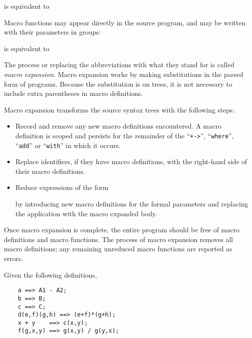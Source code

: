 
is equivalent to


Macro functions may appear directly in the source program,
and may be written with their parameters in groups:


is equivalent to


The process or replacing the abbreviations with what they stand for
is called {\em macro expansion}.
Macro expansion works by making substitutions
in the parsed form of programs.
Because the substitution is on trees, it is not
necessary to include extra parentheses in macro definitions.

Macro expansion transforms the source syntax trees with the following steps:
\begin{itemize}
\item
   Record and remove any new macro definitions encountered.
   A macro definition is scoped and persists for the remainder of the
  ``\verb"+->"'', ``\verb"where"'', ``\verb"add"'' or ``\verb"with"''
  in which it occurs.
\item
   Replace identifiers, if they have macro definitions,
   with the right-hand side of their macro definitions.
\item
   Reduce expressions of the form


by introducing new macro definitions for the formal parameters
and replacing the application with the macro expanded body.
\end{itemize}
Once macro expansion is complete, the entire program should be
free of macro definitions and macro functions.
The process of macro expansion removes all macro definitions;
any remaining unreduced macro functions are reported as errors.



Given the following definitions,

\begin{small}
\begin{verbatim}
    a ==> A1 - A2;
    b ==> B;
    c ==> C;
    d(e,f)(g,h) ==> (e+f)*(g+h);
    x + y    ==> c(x,y);
    f(g,x,y) ==> g(x,y) / g(y,x);
\end{verbatim}
\end{small}

